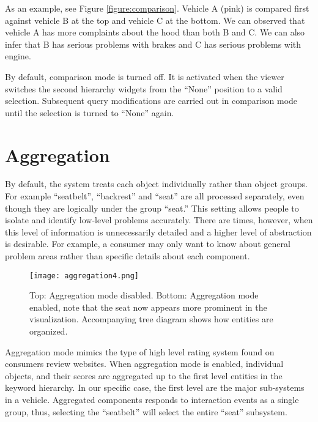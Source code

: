 As an example, see Figure \ref{figure:comparison}. Vehicle A (pink) is compared
first against vehicle B at the top and vehicle C at the bottom. We can observed
that vehicle A has more complaints about the hood than both B and C. We can also
infer that B has serious problems with brakes and C has serious problems with
engine.
 
By default, comparison mode is turned off. It is activated when the viewer
switches the second hierarchy widgets from the ``None'' position to a valid
selection. Subsequent query modifications are carried out in comparison mode
until the selection is turned to ``None'' again.


 
 
 
\section{Aggregation}
By default, the system treats each object individually rather than object
groups. For example ``seatbelt'', ``backrest'' and ``seat'' are all processed
separately, even though they are logically under the group ``seat.'' This
setting allows people to isolate and identify low-level problems accurately. There
are times, however, when this level of information is unnecessarily detailed and
a higher level of abstraction is desirable. For example, a consumer may only
want to know about general problem areas rather than specific details about each
component.

	\begin{figure}
	 \centering  
	 \texttt{[image: aggregation4.png]}
	 \caption[Aggregation View.]{Top: Aggregation mode disabled. Bottom: Aggregation
	 mode enabled, note that the seat now appears more prominent in the
	 visualization. Accompanying tree diagram shows how entities are organized.}
	 \label{figure:aggregation}
	\end{figure}
	
Aggregation mode mimics the type of high level rating system found on consumers
review websites. When aggregation mode is enabled, individual objects, and their
scores are aggregated up to the first level entities in the keyword hierarchy. In our specific case, the 
first level are the major sub-systems in a vehicle. Aggregated components
responds to interaction events as a single group, thus, selecting the
``seatbelt'' will select the entire ``seat'' subsystem.


